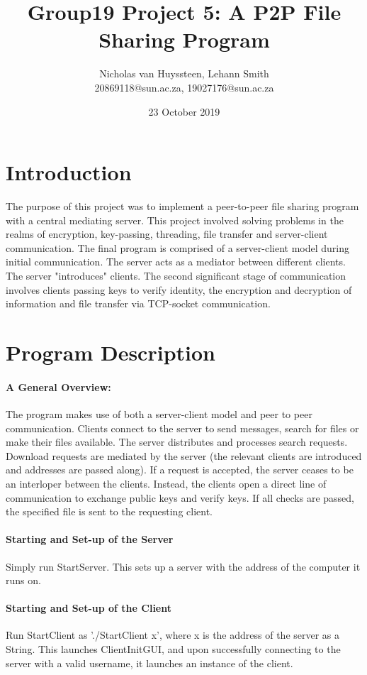 \documentclass[12pt, a4paper]{article}
\title{Group19 Project 5: A P2P File Sharing Program}
\author{Nicholas van Huyssteen, Lehann Smith\\
    \small{20869118@sun.ac.za, 19027176@sun.ac.za}
}
\date{23 October 2019}
\begin{document}
\maketitle

\section{Introduction}
The purpose of this project was to implement a peer-to-peer file sharing program with a central mediating server. This project involved solving problems in the realms of encryption, key-passing, threading, file transfer and server-client communication.
The final program is comprised of a server-client model during initial communication. The server acts as a mediator between different clients. The server "introduces" clients. The second significant stage of communication involves clients passing keys to verify identity, the encryption and decryption of information and file transfer via TCP-socket communication.

\section{Program Description}
\paragraph{A General Overview:}
The program makes use of both a server-client model and peer to peer communication. Clients connect to the server to send messages, search for files or make their files available. The server distributes and processes search requests. Download requests are mediated by the server (the relevant clients are introduced and addresses are passed along). If a request is accepted, the server ceases to be an interloper between the clients. Instead, the clients open a direct line of communication to exchange public keys and verify keys. If all checks are passed, the specified file is sent to the requesting client.

\paragraph{Starting and Set-up of the Server}
Simply run StartServer. This sets up a server with the address of the computer it runs on.

\paragraph{Starting and Set-up of the Client}
Run StartClient as './StartClient x', where x is the address of the server as a String. This launches ClientInitGUI, and upon successfully connecting to the server with a valid username, it launches an instance of the client.
\end{document}
